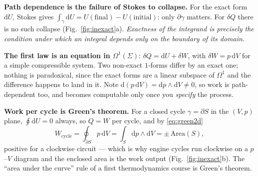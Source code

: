 \documentclass[10pt,a4paper]{article}
\newcommand{\dd}{\mathrm{d}}
\newcommand{\Om}{\Omega}
\theoremstyle{plain}
\theoremstyle{definition}
\numberwithin{equation}{section}
\begin{document}
\textbf{Path dependence is the failure of Stokes to collapse.} For the exact form $\dd U$,
Stokes gives $\int_\gamma\dd U=U(\text{final})-U(\text{initial})$: only $\partial\gamma$
matters. For $\delta Q$ there is no such collapse (Fig.~\ref{fig:inexact}a). \emph{Exactness of
the integrand is precisely the condition under which an integral depends only on the boundary of
its domain.}

\textbf{The first law is an equation in $\Om^1(\Sigma)$}: $\delta Q=\dd U+\delta W$, with
$\delta W=p\,\dd V$ for a simple compressible system. Two non-exact $1$-forms differ by an exact
one; nothing is paradoxical, since the exact forms are a linear subspace of $\Om^1$ and the
difference happens to land in it. Note $\dd(p\,\dd V)=\dd p\wedge\dd V\ne0$, so work is
path-dependent too, and becomes computable only once you \emph{specify} the process.

\textbf{Work per cycle is Green's theorem.} For a closed cycle $\gamma=\partial S$ in the
$(V,p)$ plane, $\oint\dd U=0$ always, so $Q=W$ per cycle, and by \eqref{eq:green2d}
\begin{equation}
W_{\text{cycle}}=\oint_{\partial S}p\,\dd V=\int_S\dd p\wedge\dd V=\pm\,\mathrm{Area}(S),
\label{eq:pvarea}
\end{equation}
positive for a clockwise circuit --- which is why engine cycles run clockwise on a $p$--$V$
diagram and the enclosed area is the work output (Fig.~\ref{fig:inexact}b). The ``area under the
curve'' rule of a first thermodynamics course is Green's theorem.
\end{document}
